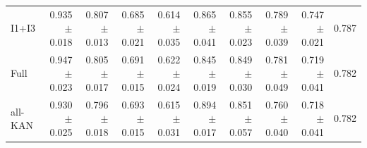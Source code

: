 \begin{table}[t]
{\begin{tabular}{lrrrrrrrrr}
I1+I3 & 0.935 $\pm$ 0.018 & 0.807 $\pm$ 0.013 & 0.685 $\pm$ 0.021 & 0.614 $\pm$ 0.035 & 0.865 $\pm$ 0.041 & 0.855 $\pm$ 0.023 & 0.789 $\pm$ 0.039 & 0.747 $\pm$ 0.021 & 0.787 \\
Full & 0.947 $\pm$ 0.023 & 0.805 $\pm$ 0.017 & 0.691 $\pm$ 0.015 & 0.622 $\pm$ 0.024 & 0.845 $\pm$ 0.019 & 0.849 $\pm$ 0.030 & 0.781 $\pm$ 0.049 & 0.719 $\pm$ 0.041 & 0.782 \\
all-KAN & 0.930 $\pm$ 0.025 & 0.796 $\pm$ 0.018 & 0.693 $\pm$ 0.015 & 0.615 $\pm$ 0.031 & 0.894 $\pm$ 0.017 & 0.851 $\pm$ 0.057 & 0.760 $\pm$ 0.040 & 0.718 $\pm$ 0.041 & 0.782 \\
\bottomrule
\end{tabular}}
\end{table}
